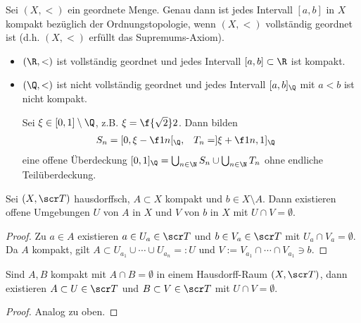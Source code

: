 \begin{st}
	Sei $(X, <)$ ein geordnete Menge.
	Genau dann ist jedes Intervall $[a,b]$ in $X$ kompakt bezüglich der Ordnungstopologie, wenn $(X, <)$ vollständig geordnet ist (d.h. $(X,<)$ erfüllt das Supremums-Axiom).
\end{st}

\begin{ex}
	\begin{itemize}
		\item
			$(\R, <)$ ist vollständig geordnet und jedes Intervall $[a,b] \subset \R$ ist kompakt.
		\item
			$(\Q, <)$ ist nicht vollständig geordnet und jedes Intervall $[a,b]_\Q$ mit $a<b$ ist nicht kompakt.

			Sei $\xi \in [0,1] \setminus \Q$, z.B. $\xi = \f{\sqrt 2}2$.
			Dann bilden
			\begin{align*}
				S_n &= [0, \xi - \f 1n[_{\Q},&
				T_n &= ]\xi + \f 1n, 1]_{\Q}
			\end{align*}
			eine offene Überdeckung $[0,1]_{\Q} = \bigcup_{n\in\N} S_n \cup \bigcup_{n\in\N} T_n$ ohne endliche Teilüberdeckung.
	\end{itemize}
\end{ex}

\begin{lem} \label{lem:hausdorff_compact_subspace_neighbourhood}
	Sei $(X, \scr T)$ hausdorffsch, $A \subset X$ kompakt und $b \in X \setminus A$.
	Dann existieren offene Umgebungen $U$ von $A$ in $X$ und $V$ von $b$ in $X$ mit $U\cap V = \emptyset$.
	\begin{proof}
		Zu $a \in A$ existieren $a \in U_a \in \scr T$ und $b \in V_a \in \scr T$ mit $U_a \cap V_a = \emptyset$.
		Da $A$ kompakt, gilt $A \subset U_{a_1} \cup \dotsb \cup U_{a_n} =: U$ und $V := V_{a_1} \cap \dotsb \cap V_{a_1} \ni b$.
	\end{proof}
\end{lem}

\begin{st}
	Sind $A, B$ kompakt mit $A \cap B = \emptyset$ in einem Hausdorff-Raum $(X, \scr T)$, dann existieren $A \subset U \in \scr T$ und $B \subset V \in \scr T$ mit $U \cap V = \emptyset$.
	\begin{proof}
		Analog zu oben.
	\end{proof}
\end{st}


